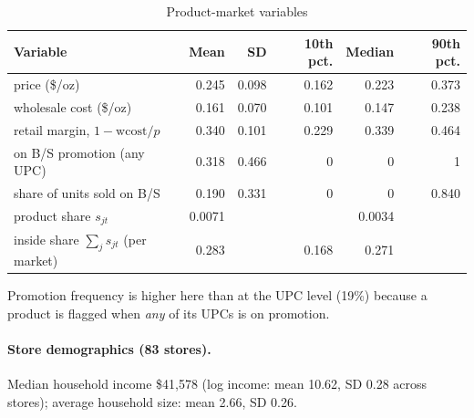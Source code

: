 \documentclass[11pt]{article}
\begin{document}
\begin{table}[htbp]
\centering
\small
\caption{Product-market variables}\label{tab:desc}
\begin{tabular}{@{}lrrrrr@{}}
\toprule
Variable & Mean & SD & 10th pct. & Median & 90th pct. \\
\midrule
price (\$/oz) & 0.245 & 0.098 & 0.162 & 0.223 & 0.373 \\
wholesale cost (\$/oz) & 0.161 & 0.070 & 0.101 & 0.147 & 0.238 \\
retail margin, $1 - \text{wcost}/p$ & 0.340 & 0.101 & 0.229 & 0.339 & 0.464 \\
on B/S promotion (any UPC) & 0.318 & 0.466 & 0 & 0 & 1 \\
share of units sold on B/S & 0.190 & 0.331 & 0 & 0 & 0.840 \\
product share $s_{jt}$ & 0.0071 & & & 0.0034 & \\
inside share $\sum_j s_{jt}$ (per market) & 0.283 & & 0.168 & 0.271 & \\
\bottomrule
\end{tabular}
\end{table}

Promotion frequency is higher here than at the UPC level (19\%) because a product is flagged
when \emph{any} of its UPCs is on promotion.

\paragraph{Store demographics (83 stores).} Median household income \$41,578 (log income: mean
10.62, SD 0.28 across stores); average household size: mean 2.66, SD 0.26.
\end{document}
